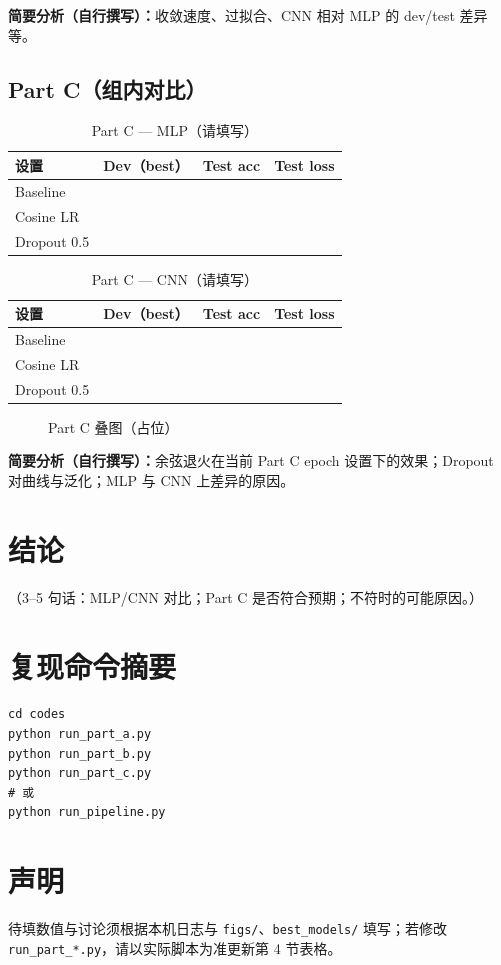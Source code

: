 \documentclass[UTF8,a4paper]{ctexart}
\begin{document}
\noindent\textbf{简要分析（自行撰写）：}收敛速度、过拟合、CNN 相对 MLP 的 dev/test 差异等。

\subsection{Part C（组内对比）}

\begin{table}[htbp]
  \centering
  \caption{Part C --- MLP（请填写）}
  \begin{tabular}{lccc}
    \toprule
    设置 & Dev（best） & Test acc & Test loss \\
    \midrule
    Baseline & & & \\
    Cosine LR & & & \\
    Dropout 0.5 & & & \\
    \bottomrule
  \end{tabular}
\end{table}

\begin{table}[htbp]
  \centering
  \caption{Part C --- CNN（请填写）}
  \begin{tabular}{lccc}
    \toprule
    设置 & Dev（best） & Test acc & Test loss \\
    \midrule
    Baseline & & & \\
    Cosine LR & & & \\
    Dropout 0.5 & & & \\
    \bottomrule
  \end{tabular}
\end{table}

\begin{figure}[htbp]
  \centering
  \caption{Part C 叠图（占位）}
\end{figure}

\noindent\textbf{简要分析（自行撰写）：}余弦退火在当前 Part C epoch 设置下的效果；Dropout 对曲线与泛化；MLP 与 CNN 上差异的原因。

\section{结论}
（3--5 句话：MLP/CNN 对比；Part C 是否符合预期；不符时的可能原因。）

\section{复现命令摘要}
\begin{lstlisting}
cd codes
python run_part_a.py
python run_part_b.py
python run_part_c.py
# 或
python run_pipeline.py
\end{lstlisting}

\section*{声明}
待填数值与讨论须根据本机日志与 \texttt{figs/}、\texttt{best\_models/} 填写；若修改 \texttt{run\_part\_*.py}，请以实际脚本为准更新第 4 节表格。
\end{document}
